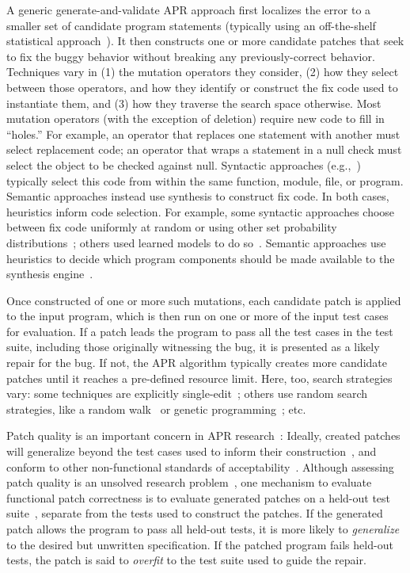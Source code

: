 \documentclass[conference]{IEEEtran}
\begin{document}
A generic generate-and-validate APR approach first
localizes the error to a smaller set of
candidate program statements (typically using an off-the-shelf statistical approach~\cite{Jones02}).  It
then constructs one or more candidate patches that seek to fix the buggy
behavior without breaking any previously-correct behavior.  
Techniques vary in (1) the mutation operators they consider, (2) how they select
between those operators, and how they identify or
construct the fix code used to instantiate them, and (3) how they traverse
the search space otherwise.  
Most mutation operators (with the exception of deletion) require new code to
fill in ``holes.''  For example, an operator that replaces one statement with
another must select replacement code; an operator that wraps a statement
in a null check must select the object to be checked against null.
Syntactic approaches (e.g.,~\cite{legoues12Genprog,long16proph,kim2013,xuan16}) typically select this code from within the
same function, module, file, or program.  Semantic approaches instead use synthesis to
construct fix code.  
In both cases, heuristics inform code selection.  For example, some syntactic approaches
choose between fix code uniformly at random or using other set probability distributions~\cite{legoues12Genprog,kim2013}; others used learned
models to do so~\cite{long16proph}.  Semantic approaches use heuristics to
decide which program components should be made available to the synthesis
engine~\cite{Mechtaev2016,xuanNopol}. 

Once constructed of one or more such mutations, each candidate patch is
applied to the input program, which is then run on
one or more of the input test cases for evaluation.  If a patch leads the
program to 
pass all the test cases in the test suite, including those originally witnessing
the bug, it is presented as a likely repair for the bug. 
If not, the APR algorithm typically creates more candidate patches 
until it reaches a pre-defined resource limit. 
Here, too, search strategies vary: some techniques 
are explicitly single-edit~\cite{Qi13TrpAutoR,Weimer13,xuanNopol}; others use
random search strategies, like a random walk~\cite{debroy10} or genetic
programming~\cite{kim2013,legoues12,xuan16}; etc. 

Patch quality is an important concern in APR research~\cite{Qi15}: Ideally,
created patches will generalize beyond the test cases used to inform their
construction~\cite{smith15}, and conform to other non-functional standards of
acceptability~\cite{fry2010,kim2013}.  Although assessing patch quality is an
unsolved research problem~\cite{monperrus14critical}, one mechanism to evaluate functional patch
correctness is to evaluate generated patches on a held-out test suite~\cite{smith15,legoues12Genprog}, separate
from the tests used to construct the patches. 
If the generated patch allows the program to pass all held-out tests, it is more likely to
\emph{generalize} to the desired but unwritten specification. If the patched
program fails held-out tests, the patch is said to \emph{overfit} to 
the test suite used to guide the repair. 
\end{document}
